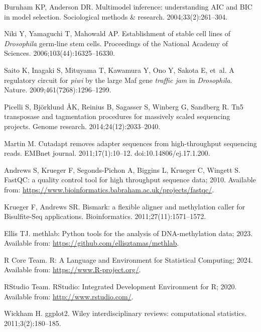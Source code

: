 \documentclass[10pt,draft,letterpaper]{article}
\begin{document}
\begin{thebibliography}{10}
Burnham KP, Anderson DR.
\newblock Multimodel inference: understanding AIC and BIC in model selection.
\newblock Sociological methods \& research. 2004;33(2):261--304.

Niki Y, Yamaguchi T, Mahowald AP.
\newblock Establishment of stable cell lines of \emph{Drosophila} germ-line stem cells.
\newblock Proceedings of the National Academy of Sciences. 2006;103(44):16325--16330.

Saito K, Inagaki S, Mituyama T, Kawamura Y, Ono Y, Sakota E, et~al.
\newblock A regulatory circuit for \textit{piwi} by the large Maf gene \textit{traffic jam} in \textit{Drosophila}.
\newblock Nature. 2009;461(7268):1296--1299.

Picelli S, Bj{\"o}rklund {\AA}K, Reinius B, Sagasser S, Winberg G, Sandberg R.
\newblock Tn5 transposase and tagmentation procedures for massively scaled sequencing projects.
\newblock Genome research. 2014;24(12):2033--2040.

Martin M.
\newblock Cutadapt removes adapter sequences from high-throughput sequencing reads.
\newblock EMBnet journal. 2011;17(1):10--12.
\newblock doi:{10.14806/ej.17.1.200}.

Andrews S, Krueger F, Segonds-Pichon A, Biggins L, Krueger C, Wingett S. FastQC: a quality control tool for high throughput sequence data; 2010.
\newblock Available from: \url{https://www.bioinformatics.babraham.ac.uk/projects/fastqc/}.

Krueger F, Andrews SR.
\newblock Bismark: a flexible aligner and methylation caller for Bisulfite-Seq applications.
\newblock Bioinformatics. 2011;27(11):1571--1572.

Ellis TJ. methlab: Python tools for the analysis of DNA-methylation data; 2023.
\newblock Available from: \url{https://github.com/ellisztamas/methlab}.

{R Core Team}. R: A Language and Environment for Statistical Computing; 2024.
\newblock Available from: \url{https://www.R-project.org/}.

{RStudio Team}. RStudio: Integrated Development Environment for R; 2020.
\newblock Available from: \url{http://www.rstudio.com/}.

Wickham H.
\newblock ggplot2.
\newblock Wiley interdisciplinary reviews: computational statistics. 2011;3(2):180--185.


\end{thebibliography}
\end{document}
